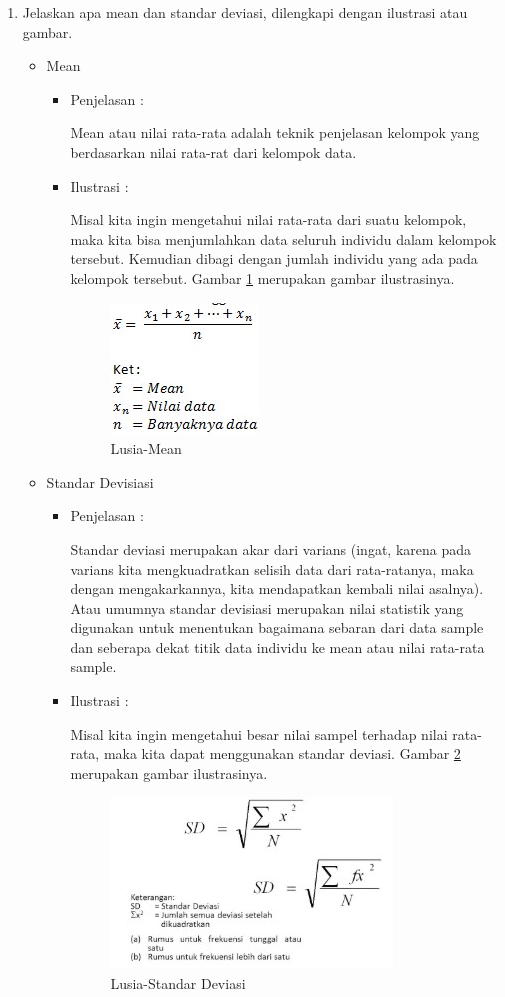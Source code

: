 \begin{enumerate}
\item Jelaskan apa mean dan standar deviasi, dilengkapi dengan ilustrasi atau gambar.
	\begin{itemize}
	\item Mean
		\begin{itemize}
		\item Penjelasan :
			\par Mean atau nilai rata-rata adalah teknik penjelasan kelompok yang berdasarkan nilai rata-rat dari kelompok data.
		\item Ilustrasi :
			\par Misal kita ingin mengetahui nilai rata-rata dari suatu kelompok, maka kita bisa menjumlahkan data seluruh individu dalam kelompok tersebut. Kemudian dibagi dengan jumlah individu yang ada pada kelompok tersebut. Gambar \ref{5a6} merupakan gambar ilustrasinya.
			\begin{figure}[ht]
			\centering
			\includegraphics[scale=0.5]{figures/p5a.jpg}
			\caption{Lusia-Mean}
			\label{5a6}
			\end{figure}
		\end{itemize}
	
	\item Standar Devisiasi
		\begin{itemize}
		\item Penjelasan :
			\par Standar deviasi merupakan akar dari varians (ingat, karena pada varians kita mengkuadratkan selisih data dari rata-ratanya, maka dengan mengakarkannya, kita mendapatkan kembali nilai asalnya). Atau umumnya standar devisiasi merupakan nilai statistik yang digunakan untuk menentukan bagaimana sebaran dari data sample dan seberapa dekat titik data individu ke mean atau nilai rata-rata sample.
			
		\item Ilustrasi :
			\par Misal kita ingin mengetahui besar nilai sampel terhadap nilai rata-rata, maka kita dapat menggunakan standar deviasi. Gambar \ref{5a7} merupakan gambar ilustrasinya.
			\begin{figure}[ht]
			\centering
			\includegraphics[scale=0.5]{figures/p5b.jpg}
			\caption{Lusia-Standar Deviasi}
			\label{5a7}
			\end{figure}
		\end{itemize}
		

\end{itemize}
\end{enumerate}

